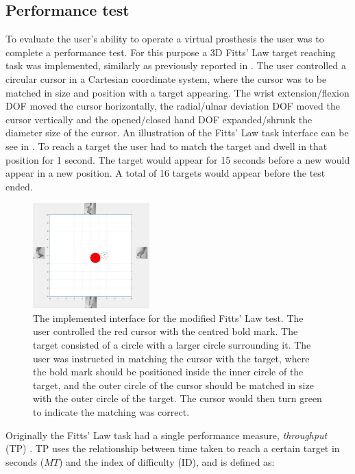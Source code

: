 \subsection{Performance test}
To evaluate the user's ability to operate a virtual prosthesis the user was to complete a performance test. For this purpose a 3D Fitts' Law target reaching task was implemented, similarly as previously reported in \cite{Scheme2013, Scheme2013a}. The user controlled a circular cursor in a Cartesian coordinate system, where the cursor was to be matched in size and position with a target appearing. The wrist extension/flexion DOF moved the cursor horizontally, the radial/ulnar deviation DOF moved the cursor vertically and the opened/closed hand DOF expanded/shrunk the diameter size of the cursor. An illustration of the Fitts' Law task interface can be see in \figref{}. To reach a target the user had to match the target and dwell in that position for 1 second. The target would appear for 15 seconds before a new would appear in a new position. A total of 16 targets would appear before the test ended. \\

\begin{figure}[H] 
	\includegraphics[width=0.4\textwidth]{figures/Paper/perftestGUI}
	\caption{The implemented interface for the modified Fitts' Law test. The user controlled the red cursor with the centred bold mark. The target consisted of a circle with a larger circle surrounding it. The user was instructed in matching the cursor with the target, where the bold mark should be positioned inside the inner circle of the target, and the outer circle of the cursor should be matched in size with the outer circle of the target. The cursor would then turn green to indicate the matching was correct.}
	\label{fig:fittsLawTask}
\end{figure}

Originally the Fitts' Law task had a single performance measure, \textit{throughput} (TP) \cite{Fitts1954}. TP uses the relationship between time taken to reach a certain target in seconds ($MT$) and the index of difficulty (ID), and is defined as:

